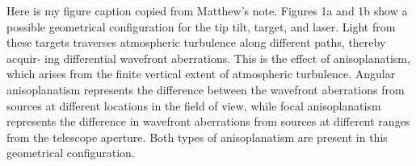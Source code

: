Here is my figure caption copied from Matthew's note. Figures 1a and 1b show a possible geometrical configuration for the tip tilt, target, and laser. Light from these targets traverses atmospheric turbulence along different paths, thereby acquir- ing differential wavefront aberrations. This is the effect of anisoplanatism, which arises from the finite vertical extent of atmospheric turbulence. Angular anisoplanatism represents the difference between the wavefront aberrations from sources at different locations in the field of view, while focal anisoplanatism represents the difference in wavefront aberrations from sources at different ranges from the telescope aperture. Both types of anisoplanatism are present in this geometrical configuration.
\label{fig:guide_star_schematic}
